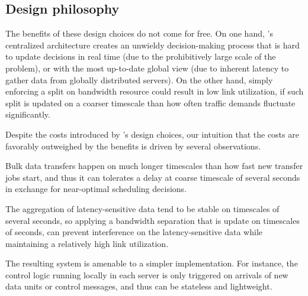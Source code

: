 \subsection{Design philosophy}

The benefits of these design choices do not come for free. 
On one hand, \name's centralized architecture creates an unwieldy 
decision-making process that is hard to update decisions in real time 
(due to the prohibitively large scale of the problem),
or with the most up-to-date global view (due to inherent latency
to gather data from globally distributed servers).
On the other hand, simply enforcing a split on bandwidth resource
could result in low link utilization, if such split is updated on a
coarser timescale than how often traffic demands fluctuate 
significantly.



Despite the costs introduced by \name's design choices, 
our intuition that the costs are favorably outweighed by the 
benefits is driven by several observations. 
\begin{packedenumerate}
\item Bulk data transfers happen on much longer timescales than 
how fast new transfer jobs start, and thus it can tolerates a delay
at coarse timescale of several seconds in exchange for near-optimal 
scheduling decisions. 
\item The aggregation of latency-sensitive data tend to be stable 
on timescales of several seconds, so applying a bandwidth separation 
that is update on timescales of seconds, can prevent interference on 
the latency-sensitive data while maintaining a relatively 
high link utilization. 
\item The resulting system is amenable to a simpler implementation. 
For instance, the control logic running locally in each server
is only triggered on arrivals of new data units or control messages, 
and thus can be stateless and lightweight.
\end{packedenumerate}

